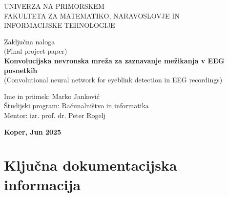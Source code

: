 \documentclass[12pt,a4paper,titlepage,openany]{report}
\begin{document}
\pagestyle{empty}
\begin{center}
\noindent \large UNIVERZA NA PRIMORSKEM\\
\large FAKULTETA ZA MATEMATIKO, NARAVOSLOVJE IN\\
INFORMACIJSKE TEHNOLOGIJE


\normalsize
\vspace{5.5cm}
Zaklju\v cna naloga\\
(Final project paper)\\
\textbf{\large Konvolucijska nevronska mreža za zaznavanje mežikanja v EEG posnetkih}\\
\normalsize
(Convolutional neural network for eyeblink detection in EEG recordings)\\
\end{center}

\begin{flushleft}
\vspace{5cm}
\noindent Ime in priimek: Marko Janković
\\
\noindent \v Studijski program: Računalništvo in informatika
\\
\noindent Mentor: izr. prof. dr. Peter Rogelj
\\
\end{flushleft}

\vspace{4cm}
\begin{center}
\large \textbf{Koper, Jun 2025}
\end{center}
\newpage

\pagestyle{fancy}

\section*{Klju\v cna dokumentacijska informacija}
\end{document}
